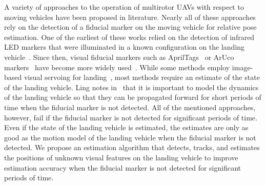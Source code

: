 A variety of approaches to the operation of multirotor UAVs with respect to
moving vehicles have been proposed in literature. Nearly all of these approaches rely on the
detection of a fiducial marker on the moving vehicle for relative pose
estimation. One of the earliest of
these works relied on the detection of infrared LED markers that were
illuminated in a known configuration on the landing
vehicle~\cite{wenzel2011automatic}. Since then, visual fiducial markers such as
AprilTags~\cite{olson2011tags} or ArUco markers~\cite{garrido2016generation}
have become more widely
used~\cite{ling2014precision,borowczyk2017autonomous,marantos2018vision,
araar2017vision}.
While some methods employ image-based visual servoing for
landing~\cite{lee2012autonomous,wynn2019visual}, most methods
require an estimate of the state of the landing vehicle.
Ling notes in~\cite{ling2014precision} that it is important to model the
dynamics of the landing vehicle so that they can be propagated forward for short
periods of time when the fiducial marker is not
detected. All of the mentioned
approaches, however, fail if the fiducial marker is not detected for
significant periods of time.
Even if the state of the landing vehicle is estimated, the estimates are only as
good as the
motion model of the landing vehicle when the fiducial marker is not detected.
We propose an estimation algorithm that detects,
tracks, and estimates the positions of unknown visual features on the landing vehicle to improve
estimation accuracy when the fiducial marker is not detected for significant
periods of time.

